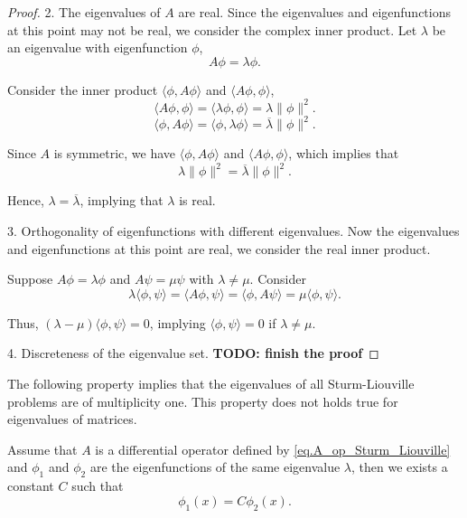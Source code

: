 \begin{proof}
    2.  The eigenvalues of $A$ are real. Since the eigenvalues and eigenfunctions at this point may not be real, we consider the complex inner product. Let $\lambda$ be an eigenvalue with eigenfunction $\phi$,
    \begin{equation}
    A\phi = \lambda \phi.
    \end{equation}
    
    Consider the inner product $\langle \phi, A\phi \rangle$ and $\langle A\phi, \phi \rangle$,
    \begin{equation}
    \langle A\phi, \phi \rangle =  \langle \lambda\phi, \phi \rangle = \lambda \|\phi\|^2.
    \end{equation}
    \begin{equation}
        \langle \phi, A\phi \rangle =  \langle \phi, \lambda\phi \rangle = \overline{\lambda} \|\phi\|^2.
    \end{equation}
    
    Since $A$ is symmetric, we have $\langle \phi, A\phi \rangle$ and $\langle A\phi, \phi \rangle$, which implies that
    \begin{equation}
    \lambda \|\phi\|^2 = \overline{\lambda} \|\phi\|^2.
    \end{equation}
    
    Hence, $\lambda = \overline{\lambda}$, implying that $\lambda$ is real.
    
    3. Orthogonality of eigenfunctions with different eigenvalues. Now the eigenvalues and eigenfunctions at this point are real, we consider the real inner product.
    
    Suppose $A\phi = \lambda \phi$ and $A\psi = \mu \psi$ with $\lambda \neq \mu$. Consider
    \begin{equation}
    \lambda \langle \phi, \psi \rangle = \langle A\phi, \psi \rangle = \langle \phi, A\psi \rangle = \mu \langle \phi, \psi \rangle.
    \end{equation}
    
    Thus, $(\lambda - \mu) \langle \phi, \psi \rangle = 0$, implying $\langle \phi, \psi \rangle = 0$ if $\lambda \neq \mu$.
    
    4. Discreteness of the eigenvalue set. 
    \textbf{TODO: finish the proof}
\end{proof}

The following property implies that the eigenvalues of all Sturm-Liouville problems are of multiplicity one. This property does not holds true for eigenvalues of matrices.
\begin{theorem}\label{th.SL_2} Assume that $A$ is a differential operator defined by \eqref{eq.A_op_Sturm_Liouville} and $\phi_1$ and $\phi_2$ are the eigenfunctions of the same eigenvalue $\lambda$, then we exists a constant $C$ such that 
    \begin{equation}\label{eq.SL_multiplicity_one}
        \phi_1(x) = C\phi_2(x).
    \end{equation}
\end{theorem}

